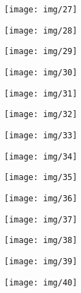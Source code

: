 \documentclass[a4paper, 12pt, twoside,openright]{report}
\begin{document}
\begin{landscape} 		
	\texttt{[image: img/27]}
\end{landscape}
\begin{landscape} 		
	\texttt{[image: img/28]}
\end{landscape}
\begin{landscape} 		
	\texttt{[image: img/29]}
\end{landscape}
\begin{landscape} 		
	\texttt{[image: img/30]}
\end{landscape}
\begin{landscape} 		
	\texttt{[image: img/31]}
\end{landscape}
\begin{landscape} 		
	\texttt{[image: img/32]}
\end{landscape}
\begin{landscape} 		
	\texttt{[image: img/33]}
\end{landscape}
\begin{landscape} 		
	\texttt{[image: img/34]}
\end{landscape}
\begin{landscape} 		
	\texttt{[image: img/35]}
\end{landscape}
\begin{landscape} 		
	\texttt{[image: img/36]}
\end{landscape}
\begin{landscape} 		
	\texttt{[image: img/37]}
\end{landscape}
\begin{landscape} 		
	\texttt{[image: img/38]}
\end{landscape}
\begin{landscape} 		
	\texttt{[image: img/39]}
\end{landscape}
\begin{landscape} 		
	\texttt{[image: img/40]}
\end{landscape}
\end{document}
